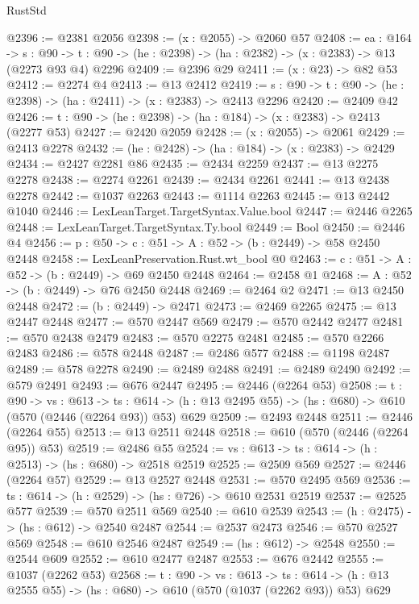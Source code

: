 \begin{lexlean}{RustStd}
\begin{coremodule}
@2396 := @2381 @2056
@2398 := (x : @2055) -> @2060 @57
@2408 := {ea : @164} ->
  {s : @90} -> {t : @90} -> (he : @2398) -> (ha : @2382) -> (x : @2383) -> @13 (@2273 @93 @4) @2296
@2409 := @2396 @29
@2411 := (x : @23) -> @82 @53
@2412 := @2274 @4
@2413 := @13 @2412
@2419 := {s : @90} -> {t : @90} -> (he : @2398) -> (ha : @2411) -> (x : @2383) -> @2413 @2296
@2420 := @2409 @42
@2426 := {t : @90} -> (he : @2398) -> (ha : @184) -> (x : @2383) -> @2413 (@2277 @53)
@2427 := @2420 @2059
@2428 := (x : @2055) -> @2061
@2429 := @2413 @2278
@2432 := (he : @2428) -> (ha : @184) -> (x : @2383) -> @2429
@2434 := @2427 @2281 @86
@2435 := @2434 @2259
@2437 := @13 @2275 @2278
@2438 := @2274 @2261
@2439 := @2434 @2261
@2441 := @13 @2438 @2278
@2442 := @1037 @2263
@2443 := @1114 @2263
@2445 := @13 @2442 @1040
@2446 := LexLeanTarget.TargetSyntax.Value.bool
@2447 := @2446 @2265
@2448 := LexLeanTarget.TargetSyntax.Ty.bool
@2449 := Bool
@2450 := @2446 @4
@2456 := {p : @50} -> {c : @51} -> {A : @52} -> (b : @2449) -> @58 @2450 @2448
@2458 := LexLeanPreservation.Rust.wt_bool @0
@2463 := {c : @51} -> {A : @52} -> (b : @2449) -> @69 @2450 @2448
@2464 := @2458 @1
@2468 := {A : @52} -> (b : @2449) -> @76 @2450 @2448
@2469 := @2464 @2
@2471 := @13 @2450 @2448
@2472 := (b : @2449) -> @2471
@2473 := @2469 @2265
@2475 := @13 @2447 @2448
@2477 := @570 @2447 @569
@2479 := @570 @2442 @2477
@2481 := @570 @2438 @2479
@2483 := @570 @2275 @2481
@2485 := @570 @2266 @2483
@2486 := @578 @2448
@2487 := @2486 @577
@2488 := @1198 @2487
@2489 := @578 @2278
@2490 := @2489 @2488
@2491 := @2489 @2490
@2492 := @579 @2491
@2493 := @676 @2447
@2495 := @2446 (@2264 @53)
@2508 := {t : @90} ->
  {vs : @613} ->
  {ts : @614} -> (h : @13 @2495 @55) -> (hs : @680) -> @610 (@570 (@2446 (@2264 @93)) @53) @629
@2509 := @2493 @2448
@2511 := @2446 (@2264 @55)
@2513 := @13 @2511 @2448
@2518 := @610 (@570 (@2446 (@2264 @95)) @53)
@2519 := @2486 @55
@2524 := {vs : @613} -> {ts : @614} -> (h : @2513) -> (hs : @680) -> @2518 @2519
@2525 := @2509 @569
@2527 := @2446 (@2264 @57)
@2529 := @13 @2527 @2448
@2531 := @570 @2495 @569
@2536 := {ts : @614} -> (h : @2529) -> (hs : @726) -> @610 @2531 @2519
@2537 := @2525 @577
@2539 := @570 @2511 @569
@2540 := @610 @2539
@2543 := (h : @2475) -> (hs : @612) -> @2540 @2487
@2544 := @2537 @2473
@2546 := @570 @2527 @569
@2548 := @610 @2546 @2487
@2549 := (hs : @612) -> @2548
@2550 := @2544 @609
@2552 := @610 @2477 @2487
@2553 := @676 @2442
@2555 := @1037 (@2262 @53)
@2568 := {t : @90} ->
  {vs : @613} ->
  {ts : @614} -> (h : @13 @2555 @55) -> (hs : @680) -> @610 (@570 (@1037 (@2262 @93)) @53) @629

\end{coremodule}
\end{lexlean}
